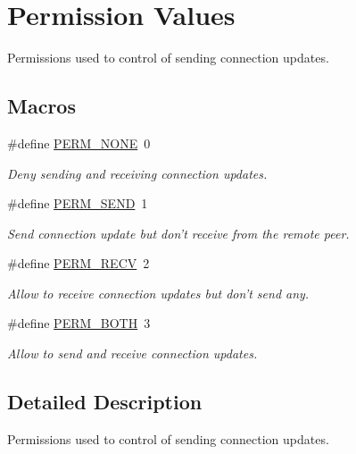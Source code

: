 \hypertarget{group___perm_values}{\section{Permission Values}
\label{group___perm_values}
}


Permissions used to control of sending connection updates.  


\subsection*{Macros}
\begin{DoxyCompactItemize}
\item 
\hypertarget{group___perm_values_gaca8351770ad21d2a65db52aff429f09d}{\#define \hyperlink{group___perm_values_gaca8351770ad21d2a65db52aff429f09d}{P\-E\-R\-M\-\_\-\-N\-O\-N\-E}~0}\label{group___perm_values_gaca8351770ad21d2a65db52aff429f09d}

\begin{DoxyCompactList}\small\item\em Deny sending and receiving connection updates. \end{DoxyCompactList}\item 
\hypertarget{group___perm_values_ga7d9032728496cbc1411aeddd30397245}{\#define \hyperlink{group___perm_values_ga7d9032728496cbc1411aeddd30397245}{P\-E\-R\-M\-\_\-\-S\-E\-N\-D}~1}\label{group___perm_values_ga7d9032728496cbc1411aeddd30397245}

\begin{DoxyCompactList}\small\item\em Send connection update but don't receive from the remote peer. \end{DoxyCompactList}\item 
\hypertarget{group___perm_values_ga562d3864d6a5360b3668a050717057ab}{\#define \hyperlink{group___perm_values_ga562d3864d6a5360b3668a050717057ab}{P\-E\-R\-M\-\_\-\-R\-E\-C\-V}~2}\label{group___perm_values_ga562d3864d6a5360b3668a050717057ab}

\begin{DoxyCompactList}\small\item\em Allow to receive connection updates but don't send any. \end{DoxyCompactList}\item 
\hypertarget{group___perm_values_ga28ba68d6c39f8158eb9ebbd279593487}{\#define \hyperlink{group___perm_values_ga28ba68d6c39f8158eb9ebbd279593487}{P\-E\-R\-M\-\_\-\-B\-O\-T\-H}~3}\label{group___perm_values_ga28ba68d6c39f8158eb9ebbd279593487}

\begin{DoxyCompactList}\small\item\em Allow to send and receive connection updates. \end{DoxyCompactList}\end{DoxyCompactItemize}


\subsection{Detailed Description}
Permissions used to control of sending connection updates. 